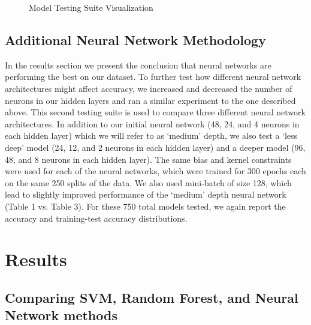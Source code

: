 \documentclass[12pt]{article}
\begin{document}
\begin{figure}[H]
\caption{Model Testing Suite Visualization}
\end{figure}

\subsection{Additional Neural Network Methodology}

In the results section we present the conclusion that neural networks are performing the best on our dataset. To further test how different neural network architectures might affect accuracy, we increased and decreased the number of neurons in our hidden layers and ran a similar experiment to the one described above. This second testing suite is used to compare three different neural network architectures. In addition to our initial neural network (48, 24, and 4 neurons in each hidden layer) which we will refer to as `medium’ depth, we also test a `less deep’ model (24, 12, and 2 neurons in each hidden layer) and a deeper model (96, 48, and 8 neurons in each hidden layer). The same bias and kernel constraints were used for each of the neural networks, which were trained for 300 epochs each on the same 250 splits of the data. We also used mini-batch of size 128, which lead to slightly improved performance of the `medium’ depth neural network (Table 1 vs. Table 3). For these 750 total models tested, we again report the accuracy and training-test accuracy distributions.

\section{Results}

\subsection{Comparing SVM, Random Forest, and Neural Network methods}
\end{document}
